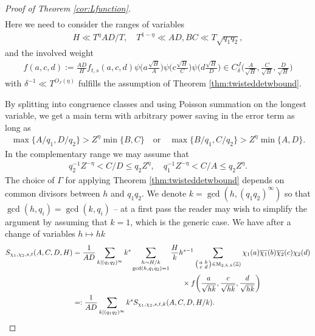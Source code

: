 \documentclass[12pt]{amsart}
\theoremstyle{definition}
\theoremstyle{remark}
\numberwithin{equation}{section}
\newcommand{\Z}{{\mathbb Z}}
\newcommand{\1}{{\mathbf 1}}
\newcommand{\MM}{\operatorname{M}}
\begin{document}
\begin{proof}[Proof of Theorem \ref{cor:Lfunction}]
\begin{align*}
\end{align*}
Here we need to consider the ranges of variables
\begin{align} \label{eq:HADrange}
    H \ll T^\eta AD/T, \quad T^{1-\eta} \ll AD,BC \ll T \sqrt{q_1q_2},
\end{align} 
and the involved weight
\begin{align*}
    f(a,c,d) :=   \frac{AD}{H} f_{t,s}(a,c,d) \psi\bigg(a \frac{\sqrt{H}}{A}\bigg) \psi\bigg(c\frac{\sqrt{H}}{C}\bigg) \psi\bigg(d\frac{\sqrt{H}}{D}\bigg)\in C^{J}_{\delta}\bigg( \frac{A}{\sqrt{H}},\frac{C}{\sqrt{H}},\frac{D}{\sqrt{H}}\bigg)
\end{align*}
with $\delta^{-1} \ll T^{O_J(\eta)}$ fulfills the assumption of Theorem \ref{thm:twisteddetwbound}.

By splitting into congruence classes and using Poisson summation on the longest variable, we get a main term with arbitrary power saving in the error term as long as
\begin{align}
    \max\{A/q_1,D/q_2\} > Z^\eta \min \{B,C\} \quad \text{or} \quad \max\{B/q_1,C/q_2\} > Z^\eta  \min\{A,D\}.
\end{align}
In the complementary range we may assume that
\begin{align} \label{eq:ratioassumption}
   q_2^{-1} Z^{-\eta} <  C/D \leq q_2 Z^\eta, \quad     q_1^{-1} Z^{-\eta} <  C/A \leq q_2 Z^\eta.
\end{align}
The choice of $\Gamma$ for applying Theorem \ref{thm:twisteddetwbound} depends on common divisors between $h$ and $q_1 q_2$. We denote $k=\gcd(h,(q_1q_2)^\infty)$ so that $\gcd(h,q_i)=\gcd(k,q_i)$ -- at a first pass the reader may wish to simplify the argument by assuming that $k=1$, which is the generic case. We have after a change of variables $h \mapsto hk$
\begin{align} \nonumber
     S_{\chi_1,\chi_2,s,t}(A,C,D,H) &=  \frac{1}{AD}\sum_{k|(q_1q_2)^\infty} k^{s}  \sum_{\substack{h \sim H/k \\ \gcd(h,q_1q_2)=1}} \frac{H}{k} h^{s-1} \sum_{\smqty(a& b \\ c & d)\in \MM_{2,h,k}(\Z)} \chi_1(a)\overline{\chi_1}(b)\overline{\chi_2}(c) \chi_2(d) \\
     & \hspace{150pt}\times f\bigg(\frac{a}{\sqrt{hk}},\frac{c}{\sqrt{hk}},\frac{d}{\sqrt{hk}}\bigg) \\ \label{eq:ADnormalization}
     &=: \frac{1}{AD}\sum_{k|(q_1q_2)^\infty} k^{s}  S_{\chi_1,\chi_2,s,t,k}(A,C,D,H/k).
\end{align}

\end{proof}
\end{document}
